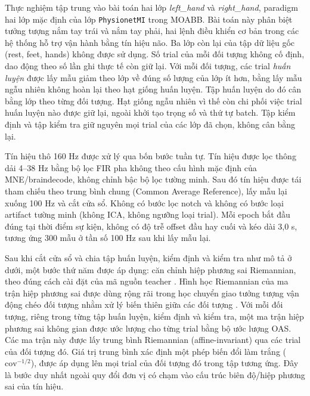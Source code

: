 Thực nghiệm tập trung vào bài toán hai lớp \emph{left\_hand} và
\emph{right\_hand}, paradigm hai lớp mặc định của lớp \texttt{PhysionetMI}
trong MOABB. Bài toán này phân biệt tưởng tượng nắm tay trái và nắm tay phải,
hai lệnh điều khiển cơ bản trong các hệ thống hỗ trợ vận hành bằng tín hiệu
não. Ba lớp còn lại của tập dữ liệu gốc (rest, feet,
hands) không được sử dụng. Số trial của mỗi đối tượng không cố định, dao
động theo số lần ghi thực tế còn giữ lại. Với mỗi đối tượng, các trial \emph{huấn luyện} được lấy mẫu giảm theo lớp
về đúng số lượng của lớp ít hơn, bằng lấy mẫu ngẫu nhiên không hoàn lại theo
hạt giống huấn luyện. Tập huấn luyện do đó cân bằng lớp theo từng đối tượng.
Hạt giống ngẫu nhiên vì thế còn chi phối việc trial huấn luyện nào được giữ
lại, ngoài khởi tạo trọng số và thứ tự batch. Tập kiểm định và tập kiểm tra
giữ nguyên mọi trial của các lớp đã chọn, không cân bằng lại.

Tín hiệu thô 160 Hz được xử lý qua bốn bước tuần tự. Tín hiệu được lọc
thông dải 4--38 Hz bằng bộ lọc FIR pha không theo cấu hình mặc định của
MNE/braindecode, không chỉnh bậc bộ lọc tường minh. Sau đó tín hiệu được tái
tham chiếu theo trung bình chung (Common Average Reference), lấy mẫu lại
xuống 100 Hz và cắt cửa sổ. Không có bước lọc
notch và không có bước loại artifact tường minh (không ICA, không ngưỡng loại
trial). Mỗi epoch bắt đầu đúng tại thời điểm sự kiện, không
có độ trễ offset đầu hay cuối và kéo dài 3,0 s, tương ứng 300 mẫu ở tần số 100 Hz sau khi lấy mẫu lại.

Sau khi cắt cửa sổ và chia tập huấn luyện, kiểm định và kiểm tra như mô tả ở dưới, một bước thứ
năm được áp dụng: căn chỉnh hiệp phương sai Riemannian, theo đúng cách cài
đặt của mã nguồn teacher \cite{zoumpourlis2024motor}. Hình học Riemannian
của ma trận hiệp phương sai được dùng rộng rãi trong học chuyển giao tưởng
tượng vận động chéo đối tượng nhằm xử lý biến thiên giữa các đối tượng
\cite{xu2021selective}. Với mỗi đối tượng, riêng trong từng tập huấn luyện, kiểm định và kiểm tra,
một ma trận hiệp phương sai không gian được ước lượng cho từng trial bằng bộ
ước lượng OAS. Các ma trận này được lấy trung bình Riemannian
(affine-invariant) qua các trial của đối tượng đó. Giá trị trung bình xác
định một phép biến đổi làm trắng ($\mathrm{cov}^{-1/2}$), được áp dụng lên
mọi trial của đối tượng đó trong tập tương ứng. Đây là bước duy nhất
ngoài quy đổi đơn vị có chạm vào cấu trúc biên độ/hiệp phương sai của tín
hiệu.

